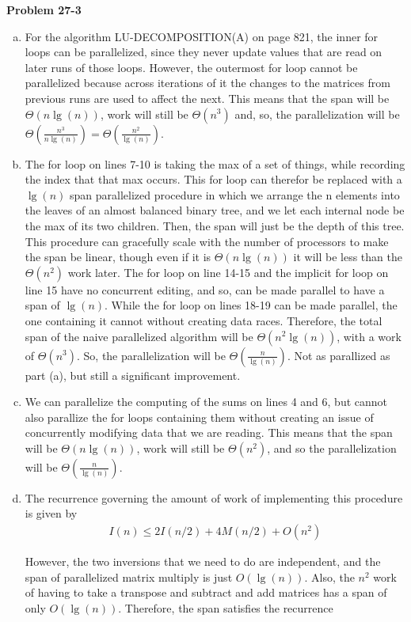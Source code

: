 \documentclass{article}
\begin{document}
\noindent\textbf{Problem 27-3}\\
\begin{enumerate}[a.]
\item For the algorithm LU-DECOMPOSITION(A) on page 821, the inner for loops can be parallelized, since they never update values that are read on later runs of those loops. However, the outermost for loop cannot be parallelized because across iterations of it the changes to the matrices from previous runs are used to affect the next. This means that the span will be $\Theta(n\lg(n))$, work will still be $\Theta(n^3)$ and, so, the parallelization will be $\Theta(\frac{n^3}{n\lg(n)}) = \Theta(\frac{n^2}{\lg(n)})$.
\item
The for loop on lines 7-10 is taking the max of a set of things, while recording the index that that max occurs. This for loop can therefor be replaced with a $\lg(n)$ span parallelized procedure in which we arrange the n elements into the leaves of an almost balanced binary tree, and we let each internal node be the max of its two children. Then, the span will just be the depth of this tree. This procedure can gracefully scale with the number of processors to make the span be linear, though even if it is $\Theta(n\lg(n))$ it will be less than the $\Theta(n^2)$ work later. The for loop on line 14-15 and the implicit for loop on line 15 have no concurrent editing, and so, can be made parallel to have a span of $\lg(n)$. While the for loop on lines 18-19 can be made parallel, the one containing it cannot without creating data races. Therefore, the total span of the naive parallelized algorithm will be $\Theta(n^2\lg(n))$, with a work of $\Theta(n^3)$. So, the parallelization will be $\Theta(\frac{n}{\lg(n)})$. Not as parallized as part (a), but still a significant improvement. 
\item
We can parallelize the computing of the sums on lines 4 and 6, but cannot also parallize the for loops containing them without creating an issue of concurrently modifying data that we are reading. This means that the span will be $\Theta(n\lg(n))$, work will still be $\Theta(n^2)$, and so the parallelization will be $\Theta(\frac{n}{\lg(n)})$.
\item
The recurrence governing the amount of work of implementing this procedure is given by
\begin{align*}
I(n) \le 2 I(n/2) + 4 M(n/2) + O(n^2)
\end{align*}

However, the two inversions that we need to do are independent, and the span of parallelized matrix multiply is just $O(\lg(n))$. Also, the $n^2$ work of having to take a transpose and subtract and add matrices has a span of only $O(\lg(n))$. Therefore, the span satisfies the recurrence


\end{enumerate}
\end{document}
